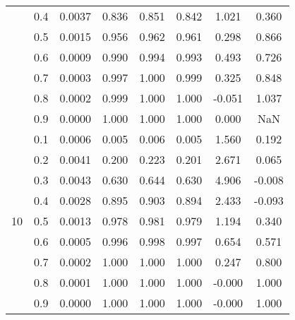 \documentclass[11pt,a4paper]{report}
\begin{document}
\begin{longtable}{ | c | c || c | c | c | c | c | c | }
 & 0.4 & 0.0037 & 0.836 & 0.851 & 0.842 & 1.021 & 0.360 \\
 & 0.5 & 0.0015 & 0.956 & 0.962 & 0.961 & 0.298 & 0.866 \\
 & 0.6 & 0.0009 & 0.990 & 0.994 & 0.993 & 0.493 & 0.726 \\
 & 0.7 & 0.0003 & 0.997 & 1.000 & 0.999 & 0.325 & 0.848 \\
 & 0.8 & 0.0002 & 0.999 & 1.000 & 1.000 & -0.051 & 1.037 \\
 & 0.9 & 0.0000 & 1.000 & 1.000 & 1.000 & 0.000 & NaN \\
 \hline
\multirow{9}{*}{10} & 0.1 & 0.0006 & 0.005 & 0.006 & 0.005 & 1.560 & 0.192 \\
 & 0.2 & 0.0041 & 0.200 & 0.223 & 0.201 & 2.671 & 0.065 \\
 & 0.3 & 0.0043 & 0.630 & 0.644 & 0.630 & 4.906 & -0.008 \\
 & 0.4 & 0.0028 & 0.895 & 0.903 & 0.894 & 2.433 & -0.093 \\
 & 0.5 & 0.0013 & 0.978 & 0.981 & 0.979 & 1.194 & 0.340 \\
 & 0.6 & 0.0005 & 0.996 & 0.998 & 0.997 & 0.654 & 0.571 \\
 & 0.7 & 0.0002 & 1.000 & 1.000 & 1.000 & 0.247 & 0.800 \\
 & 0.8 & 0.0001 & 1.000 & 1.000 & 1.000 & -0.000 & 1.000 \\
 & 0.9 & 0.0000 & 1.000 & 1.000 & 1.000 & -0.000 & 1.000 \\
 \hline
\hline
\end{longtable}
\end{document}
